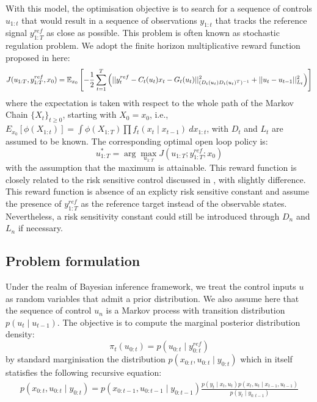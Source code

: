 With this model, the optimisation objective is to search for a sequence of controls $u_{1:t}$ that would result in a sequence of observations $y_{1:t}$ that tracks the reference signal $y^{ref}_{1:T}$ as close as possible. This problem is often known as stochastic regulation problem. We adopt the finite horizon multiplicative reward function proposed in \cite{NK11} here:
\begin{equation}
  J(u_{1:T},y^{ref}_{1:T}, x_0) = \operatorname{\mathbb{E}}_{x_0}\left[ -\dfrac{1}{2}\displaystyle\sum^T_{t=1}\left(\vert\vert y^{ref}_t - C_t(u_t)x_t - G_t(u_t) \vert\vert^2_{(D_t(u_t)D_t(u_t)^T)^{-1}}  + \vert\vert u_t - u_{t-1} \vert\vert^2_{L_t}\right) \right]
\end{equation}
where the expectation is taken with respect to the whole path of the Markov Chain $\{X_t\}_{t \geq 0}$, starting with $X_0 = x_0$,  i.e., $E_{x_0}[\phi(X_{1:t})] = \displaystyle\int \phi(X_{1:T}) \prod f_t(x_t \mid x_{t-1})~dx_{1:t}$, with $D_t$ and $L_t$ are assumed to be known. The corresponding optimal open loop policy is:
\begin{equation}
  u^*_{1:T} = \arg\max_{u_{1:T}} J(u_{1:T};y^{ref}_{1:T};x_0)
\label{eq:optcontrol}
\end{equation}
with the assumption that the maximum is attainable. This reward function is closely related to the risk sensitive control discussed in \cite{WR90}, with slightly difference. This reward function is absence of an explicty risk sensitive constant and assume the presence of $y^{ref}_{1:T}$ as the reference target instead of the observable states. Nevertheless, a risk sensitivity constant could still be introduced through $D_n$ and $L_n$ if necessary.

\subsection{Problem formulation}
Under the realm of Bayesian inference framework, we treat the control inputs $u$ as random variables that admit a prior distribution. We also assume here that the sequence of control $u_n$ is a Markov process with transition distribution $p(u_t \mid u_{t-1})$. The objective is to compute the marginal posterior distribution density:
\begin{equation}
 \pi_t(u_{0:t}) = p(u_{0:t} \mid y^{ref}_{0:t})
\end{equation} 
by standard marginisation the distribution $p(x_{0:t}, u_{0:t} \mid y_{0:t})$ which in itself statisfies the following recursive equation:
\begin{align}
  p(x_{0:t}, u_{0:t} \mid y_{0:t}) = p(x_{0:t-1}, u_{0:t-1} \mid y_{0:t-1}) \frac{p(y_t \mid x_t, u_t)p(x_t, u_t \mid x_{t-1}, u_{t-1})}{p(y_t \mid y_{0:t-1})}
\end{align}
 
